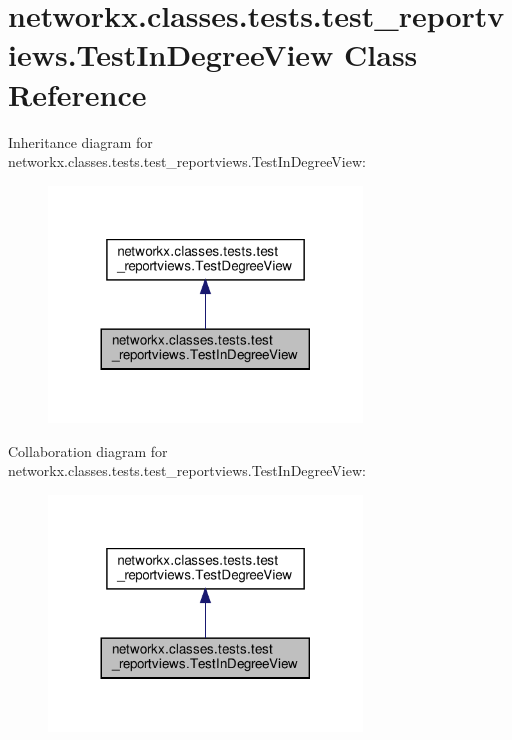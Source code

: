 \hypertarget{classnetworkx_1_1classes_1_1tests_1_1test__reportviews_1_1TestInDegreeView}{}\section{networkx.\+classes.\+tests.\+test\+\_\+reportviews.\+Test\+In\+Degree\+View Class Reference}
\label{classnetworkx_1_1classes_1_1tests_1_1test__reportviews_1_1TestInDegreeView}


Inheritance diagram for networkx.\+classes.\+tests.\+test\+\_\+reportviews.\+Test\+In\+Degree\+View\+:
\nopagebreak
\begin{figure}[H]
\begin{center}
\leavevmode
\includegraphics[width=236pt]{classnetworkx_1_1classes_1_1tests_1_1test__reportviews_1_1TestInDegreeView__inherit__graph}
\end{center}
\end{figure}


Collaboration diagram for networkx.\+classes.\+tests.\+test\+\_\+reportviews.\+Test\+In\+Degree\+View\+:
\nopagebreak
\begin{figure}[H]
\begin{center}
\leavevmode
\includegraphics[width=236pt]{classnetworkx_1_1classes_1_1tests_1_1test__reportviews_1_1TestInDegreeView__coll__graph}
\end{center}
\end{figure}
